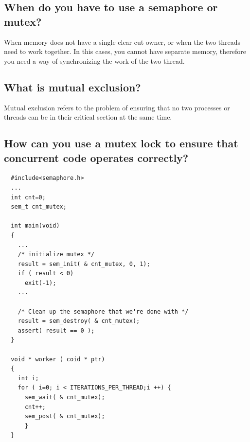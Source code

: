 \documentclass[a4paper]{article}
\begin{document}
\subsection{When do you have to use a semaphore or mutex?} %
\label{sub:When do you have to use a semaphore or mutex?}
When memory does not have a single clear cut owner, or when the two threads need to work together. In this cases, you cannot have
separate memory, therefore you need a way of synchronizing the work of the two thread.
\subsection{What is mutual exclusion?} %
\label{sub:What is mutual exclusion?}
Mutual exclusion refers to the problem of ensuring that no two processes or threads can be in their critical section at the same time. 
\subsection{How can you use a mutex lock to ensure that concurrent code operates correctly?} %
\label{sub:How can you use a mutex lock to ensure that concurrent code operates correctly?`}

\begin{lstlisting}
  #include<semaphore.h>
  ...
  int cnt=0;
  sem_t cnt_mutex;

  int main(void)
  {
    ...
    /* initialize mutex */
    result = sem_init( & cnt_mutex, 0, 1);
    if ( result < 0)
      exit(-1);
    ...

    /* Clean up the semaphore that we're done with */
    result = sem_destroy( & cnt_mutex);
    assert( result == 0 ); 
  }

  void * worker ( coid * ptr)
  {
    int i;
    for ( i=0; i < ITERATIONS_PER_THREAD;i ++) {
      sem_wait( & cnt_mutex);
      cnt++;
      sem_post( & cnt_mutex);
      }
  }
\end{lstlisting}
\end{document}
